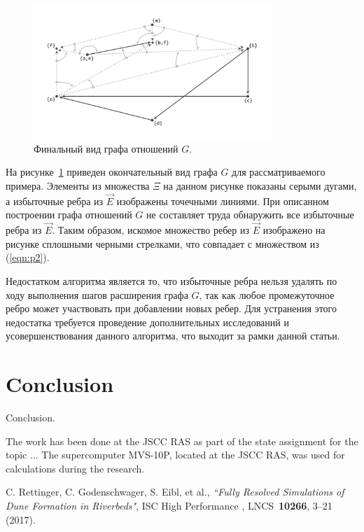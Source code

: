 \documentclass[
11pt,%
tightenlines,%
twoside,%
onecolumn,%
nofloats,%
nobibnotes,%
nofootinbib,%
superscriptaddress,%
noshowpacs,%
centertags]%
{revtex4}
\begin{document}
\begin{figure}[h]
\setcaptionmargin{5mm}
\onelinecaptionsfalse %
\includegraphics[width=0.8\textwidth]{pics/g.pdf}
\caption{Финальный вид графа отношений $G$.}
\label{fig:g}
\end{figure}

На рисунке~\ref{fig:g} приведен окончательный вид графа $G$ для рассматриваемого примера.
Элементы из множества $\Xi$ на данном рисунке показаны серыми дугами, а избыточные ребра из $\overrightarrow{E}$ изображены точечными линиями.
При описанном построении графа отношений $G$ не составляет труда обнаружить все избыточные ребра из $\overrightarrow{E}$.
Таким образом, искомое множество ребер из $\overrightarrow{E}$ изображено на рисунке сплошными черными стрелками, что совпадает с множеством из (\ref{eqn:p2}).

Недостатком алгоритма является то, что избыточные ребра нельзя удалять по ходу выполнения шагов расширения графа $G$, так как любое промежуточное ребро может участвовать при добавлении новых ребер.
Для устранения этого недостатка требуется проведение дополнительных исследований и усовершенствования данного алгоритма, что выходит за рамки данной статьи.

\section{Conclusion}

Conclusion.

\begin{acknowledgments}
The work has been done at the JSCC RAS as part of the state assignment for the topic ... The supercomputer MVS-10P, located at the JSCC RAS, was used for calculations during the research.
\end{acknowledgments}

\begin{thebibliography}{99}

C. Rettinger, C. Godenschwager, S. Eibl, et al., {\it ``Fully Resolved Simulations of Dune Formation in Riverbeds"}, ISC High Performance , LNCS~{\bf 10266}, 3--21 (2017).

\end{thebibliography}
\end{document}
